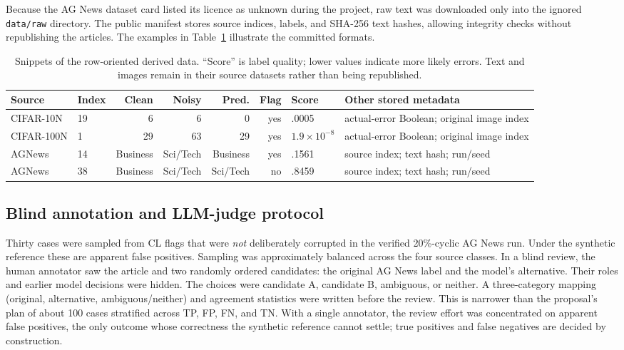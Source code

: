 \documentclass[11pt]{article}
\begin{document}
Because the AG News dataset card listed its licence as unknown during the
project, raw text was downloaded only into the ignored \texttt{data/raw}
directory. The public manifest stores source indices, labels, and SHA-256 text
hashes, allowing integrity checks without republishing the articles. The
examples in Table~\ref{tab:data-snippet} illustrate the committed formats.

\begin{table}[t]
\centering
\small
\setlength{\tabcolsep}{4pt}
\begin{tabular}{llrrrrlp{3.8cm}}
\toprule
\textbf{Source} & \textbf{Index} & \textbf{Clean} & \textbf{Noisy} & \textbf{Pred.} & \textbf{Flag} & \textbf{Score} & \textbf{Other stored metadata} \\
\midrule
CIFAR-10N & 19 & 6 & 6 & 0 & yes & .0005 & actual-error Boolean; original image index \\
CIFAR-100N & 1 & 29 & 63 & 29 & yes & $1.9{\times}10^{-8}$ & actual-error Boolean; original image index \\
AGNews & 14 & Business & Sci/Tech & Business & yes & .1561 & source index; text hash; run/seed \\
AGNews & 38 & Business & Sci/Tech & Sci/Tech & no & .8459 & source index; text hash; run/seed \\
\bottomrule
\end{tabular}
\caption{Snippets of the row-oriented derived data. ``Score'' is label
quality; lower values indicate more likely errors. Text and images remain in
their source datasets rather than being republished.}
\label{tab:data-snippet}
\end{table}

\subsection{Blind annotation and LLM-judge protocol}

Thirty cases were sampled from CL flags that were \emph{not} deliberately
corrupted in the verified 20\%-cyclic AG News run. Under the synthetic
reference these are apparent false positives. Sampling was approximately balanced across the
four source classes. In a blind review, the human annotator saw the article and
two randomly ordered candidates: the original AG News label and the model's
alternative. Their roles and earlier model decisions were hidden. The choices
were candidate A, candidate B, ambiguous, or neither. A three-category mapping
(original, alternative, ambiguous/neither) and agreement statistics were
written before the review. This is narrower than the proposal's plan of
about 100 cases stratified across TP, FP, FN, and TN. With a single annotator,
the review effort was concentrated on apparent false positives, the only
outcome whose correctness the synthetic reference cannot settle; true
positives and false negatives are decided by construction.
\end{document}
